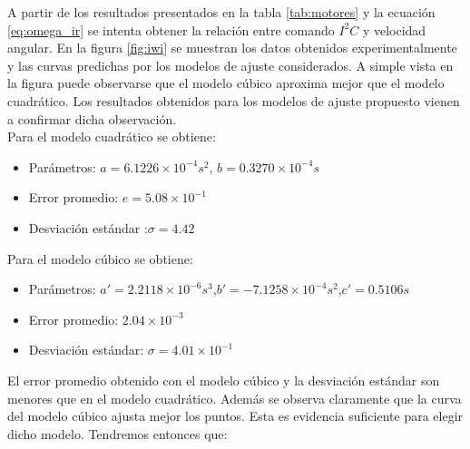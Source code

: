 \documentclass[main]{subfiles}
\begin{document}
A partir de los resultados presentados en la tabla \ref{tab:motores} y la ecuaci\'on \ref{eq:omega_ir} se intenta obtener la relaci\'on entre comando $I^2C$ y velocidad angular. En la figura \ref{fig:iwi} se muestran los datos obtenidos experimentalmente y las curvas predichas por los modelos de ajuste considerados. A simple vista en la figura puede observarse que el modelo c\'ubico aproxima mejor que el modelo cuadr\'atico.
Los resultados obtenidos para los modelos de ajuste propuesto vienen a confirmar dicha observaci\'on.\\

Para el modelo cuadr\'atico se obtiene:
\begin{itemize}
\item Par\'ametros: \newline$a=6.1226\times10^{-4}s^2$, \newline$b=0.3270\times 10^{-4}s$
\item Error promedio: $e=5.08\times 10 ^{-1}$
\item Desviaci\'on est\'andar :$\sigma=4.42$
\end{itemize}

Para el modelo c\'ubico se obtiene:
\begin{itemize}
\item Par\'ametros: \newline$a\prime = 2.2118\times 10^{-6}s^3$,\newline$b\prime =-7.1258\times 10^{-4}s^2$,\newline$c\prime=0.5106s$
\item Error promedio: $2.04\times10^{-3} $
\item Desviaci\'on est\'andar: $\sigma=4.01\times 10^{-1}$
\end{itemize}

El error promedio obtenido con el modelo c\'ubico y la desviaci\'on est\'andar son menores que en el modelo cuadr\'atico. Adem\'as se observa claramente que la curva del modelo c\'ubico ajusta mejor los puntos. Esta es evidencia suficiente para elegir dicho modelo. Tendremos entonces que:
\end{document}
